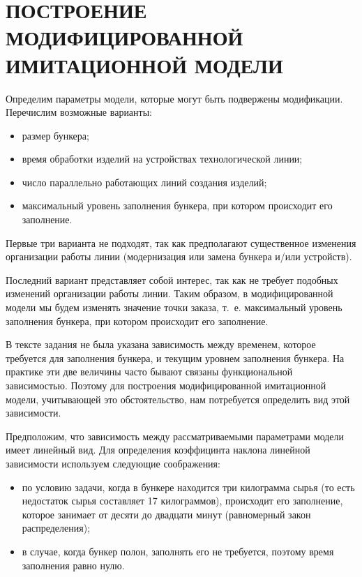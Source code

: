 \section[Построение модифицированной имитационной модели]{
  ПОСТРОЕНИЕ МОДИФИЦИРОВАННОЙ \\
  ИМИТАЦИОННОЙ МОДЕЛИ}
\label{sec:modified_model}

Определим параметры модели, которые могут быть подвержены модификации.
Перечислим возможные варианты:

\begin{itemize}
\item размер бункера;
\item время обработки изделий на устройствах технологической линии;
\item число параллельно работающих линий создания изделий;
\item максимальный уровень заполнения бункера, при котором происходит
  его заполнение.
\end{itemize}

Первые три варианта не подходят, так как предполагают существенное
изменения организации работы линии
(модернизация или замена бункера и/или устройств).

Последний вариант представляет собой интерес, так как не требует подобных
изменений организации работы линии.
Таким образом, в модифицированной модели мы будем изменять значение точки заказа,
т.~е. максимальный уровень заполнения бункера,
при котором происходит его заполнение.

В тексте задания не была указана зависимость между временем, которое
требуется для заполнения бункера, и текущим уровнем заполнения бункера.
На практике эти две величины часто бывают связаны функциональной зависимостью.
Поэтому для построения модифицированной имитационной модели,
учитывающей это обстоятельство, нам потребуется определить вид этой зависимости.

Предположим, что зависимость между рассматриваемыми параметрами модели
имеет линейный вид. Для определения коэффицинта наклона линейной зависимости
используем следующие соображения:

\begin{itemize}
\item по условию задачи, когда в бункере находится три килограмма 
  сырья (то есть недостаток сырья составляет 17 килограммов), 
  происходит его заполнение, которое занимает от десяти до двадцати минут
  (равномерный закон распределения);  
\item в случае, когда бункер полон,
  заполнять его не требуется, поэтому время заполнения равно нулю.
\end{itemize}

